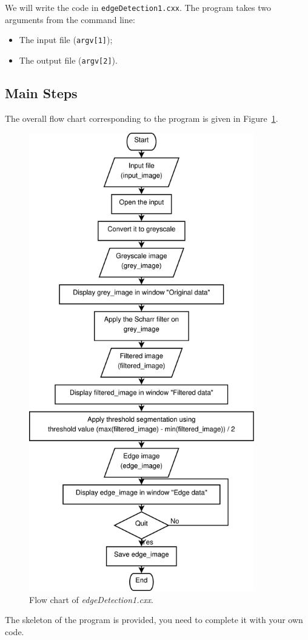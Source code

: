 \documentclass[english,a4paper,12pt,oneside]{article}
\begin{document}
We will write the code in \verb+edgeDetection1.cxx+.
The program takes two arguments from the command line:
\begin{itemize}
 \item The input file (\verb+argv[1]+); 
 \item The output file (\verb+argv[2]+).
\end{itemize}

\subsection{Main Steps}
The overall flow chart corresponding to the program is given in Figure~\ref{fig:flowChart}. 
\begin{figure}[htbp]
 \centering
 \includegraphics[height=20cm]{flow_chart_edge_detection}
 \caption{\label{fig:flowChart}Flow chart of \emph{edgeDetection1.cxx}.}
\end{figure}
The skeleton of the program is provided, you need to complete it with your own code. 
\end{document}
